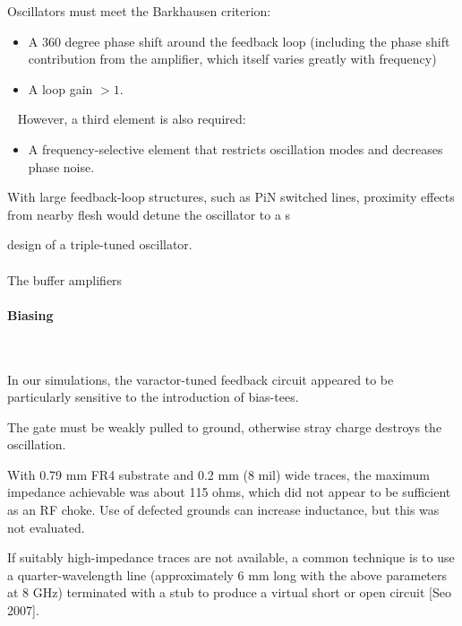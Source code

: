 \documentclass[fleqn,10pt]{article}
\begin{document}
\begin{multicols}{1}
Oscillators must meet the Barkhausen criterion:

\begin{itemize}

\item A 360 degree phase shift around the feedback loop (including the phase shift contribution from the amplifier, which itself varies greatly with frequency)
\item A loop gain $>1.$ 

\end{itemize}\
%
However, a third element is also required:
%
\begin{itemize}
\item A frequency-selective element that restricts oscillation modes and decreases phase noise.
\end{itemize}
%

With large feedback-loop structures, such as PiN switched lines, proximity effects from nearby flesh would detune the oscillator to a s



 design of a triple-tuned oscillator.


\paragraph{}
The buffer amplifiers 

\paragraph{Biasing}\

In our simulations, the varactor-tuned feedback circuit appeared to be particularly sensitive to the introduction of bias-tees. 


The gate must be weakly pulled to ground, otherwise stray charge destroys the oscillation.




With 0.79 mm FR4 substrate and 0.2 mm (8 mil) wide traces, the maximum impedance achievable was about 115 ohms, which did not appear to be sufficient as an RF choke. Use of defected grounds can increase inductance, but this was not evaluated.

If suitably high-impedance traces are not available, a common technique is to use a quarter-wavelength line (approximately 6 mm long with the above parameters at 8 GHz) terminated with a stub to produce a virtual short or open circuit [Seo 2007]. 


\end{multicols}
\end{document}
